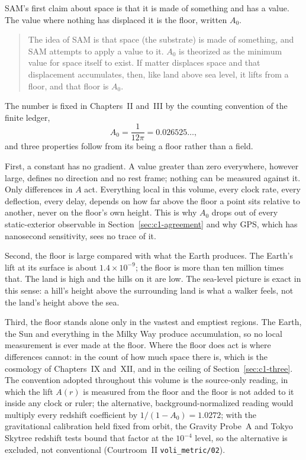 SAM's first claim about space is that it is made of something and has a value. The value where nothing has displaced it is the floor, written $A_0$.
\begin{quote}
The idea of SAM is that space (the substrate) is made of something, and SAM attempts to apply a value to it. $A_0$ is theorized as the minimum value for space itself to exist. If matter displaces space and that displacement accumulates, then, like land above sea level, it lifts from a floor, and that floor is $A_0$.
\end{quote}
The number is fixed in Chapters~II and~III by the counting convention of the finite ledger,
\begin{equation}
A_0=\frac{1}{12\pi}=0.026525\ldots,
\label{eq:c1-floor}
\end{equation}
and three properties follow from its being a floor rather than a field.

First, a constant has no gradient. A value greater than zero everywhere, however large, defines no direction and no rest frame; nothing can be measured against it. Only differences in $A$ act. Everything local in this volume, every clock rate, every deflection, every delay, depends on how far above the floor a point sits relative to another, never on the floor's own height. This is why $A_0$ drops out of every static-exterior observable in Section~\ref{sec:c1-agreement} and why GPS, which has nanosecond sensitivity, sees no trace of it.

Second, the floor is large compared with what the Earth produces. The Earth's lift at its surface is about $1.4\times10^{-9}$; the floor is more than ten million times that. The land is high and the hills on it are low. The sea-level picture is exact in this sense: a hill's height above the surrounding land is what a walker feels, not the land's height above the sea.

Third, the floor stands alone only in the vastest and emptiest regions. The Earth, the Sun and everything in the Milky Way produce accumulation, so no local measurement is ever made at the floor. Where the floor does act is where differences cannot: in the count of how much space there is, which is the cosmology of Chapters~IX and~XII, and in the ceiling of Section~\ref{sec:c1-three}. The convention adopted throughout this volume is the source-only reading, in which the lift $A(r)$ is measured from the floor and the floor is not added to it inside any clock or ruler; the alternative, background-normalized reading would multiply every redshift coefficient by $1/(1-A_0)=1.0272$; with the gravitational calibration held fixed from orbit, the Gravity Probe~A and Tokyo Skytree redshift tests bound that factor at the $10^{-4}$ level, so the alternative is excluded, not conventional (Courtroom~II \texttt{voli\_metric/02}).

